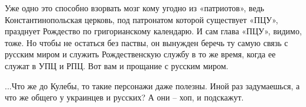 Уже одно это способно взорвать мозг кому угодно из «патриотов», ведь
Константинопольская церковь, под патронатом которой существует «ПЦУ», празднует
Рождество по григорианскому календарю. И сам глава «ПЦУ», видимо, тоже. Но
чтобы не остаться без паствы, он вынужден беречь ту самую связь с русским миром
и служить Рождественскую службу в то же время, когда ее служат в УПЦ и РПЦ. Вот
вам и прощание с русским миром.

...Что же до Кулебы, то такие персонажи даже полезны. Иной раз задумаешься, а
что же общего у украинцев и русских? А они – хоп, и подскажут.  

